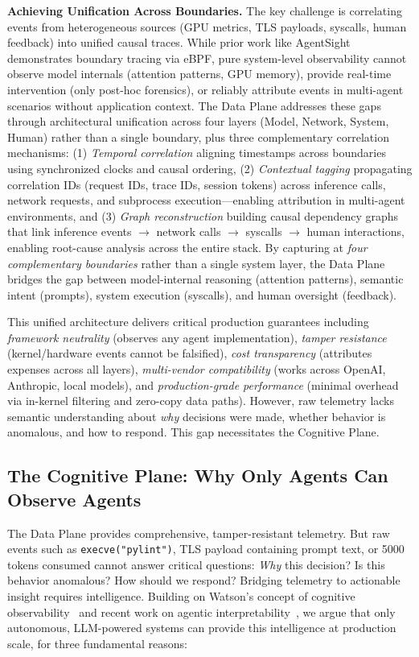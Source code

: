 \documentclass[sigplan,screen,9pt]{acmart}
\begin{document}
\textbf{Achieving Unification Across Boundaries.} The key challenge is correlating events from heterogeneous sources (GPU metrics, TLS payloads, syscalls, human feedback) into unified causal traces. While prior work like AgentSight~\cite{zheng2025agentsight} demonstrates boundary tracing via eBPF, pure system-level observability cannot observe model internals (attention patterns, GPU memory), provide real-time intervention (only post-hoc forensics), or reliably attribute events in multi-agent scenarios without application context. The Data Plane addresses these gaps through architectural unification across four layers (Model, Network, System, Human) rather than a single boundary, plus three complementary correlation mechanisms: (1) \emph{Temporal correlation} aligning timestamps across boundaries using synchronized clocks and causal ordering, (2) \emph{Contextual tagging} propagating correlation IDs (request IDs, trace IDs, session tokens) across inference calls, network requests, and subprocess execution---enabling attribution in multi-agent environments, and (3) \emph{Graph reconstruction} building causal dependency graphs that link inference events $\rightarrow$ network calls $\rightarrow$ syscalls $\rightarrow$ human interactions, enabling root-cause analysis across the entire stack. By capturing at \emph{four complementary boundaries} rather than a single system layer, the Data Plane bridges the gap between model-internal reasoning (attention patterns), semantic intent (prompts), system execution (syscalls), and human oversight (feedback).

This unified architecture delivers critical production guarantees including \emph{framework neutrality} (observes any agent implementation), \emph{tamper resistance} (kernel/hardware events cannot be falsified), \emph{cost transparency} (attributes expenses across all layers), \emph{multi-vendor compatibility} (works across OpenAI, Anthropic, local models), and \emph{production-grade performance} (minimal overhead via in-kernel filtering and zero-copy data paths). However, raw telemetry lacks semantic understanding about \emph{why} decisions were made, whether behavior is anomalous, and how to respond. This gap necessitates the Cognitive Plane.

\subsection{The Cognitive Plane: Why Only Agents Can Observe Agents}

The Data Plane provides comprehensive, tamper-resistant telemetry. But raw events such as \texttt{execve("pylint")}, TLS payload containing prompt text, or 5000 tokens consumed cannot answer critical questions: \emph{Why} this decision? Is this behavior anomalous? How should we respond? Bridging telemetry to actionable insight requires intelligence. Building on Watson's concept of cognitive observability~\cite{Rombaut2025Watson} and recent work on agentic interpretability~\cite{Kim2025AgenticInterp}, we argue that only autonomous, LLM-powered systems can provide this intelligence at production scale, for three fundamental reasons:
\end{document}
